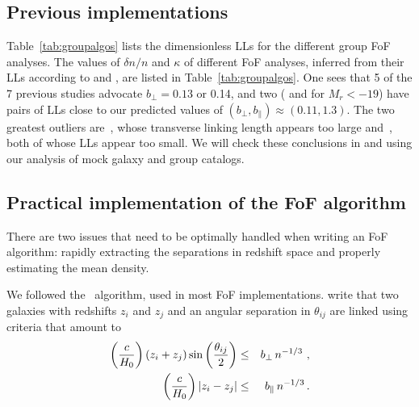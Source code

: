 \subsection{Previous implementations}

Table~\ref{tab:groupalgos} lists the dimensionless LLs for the different group
FoF analyses. The values of $\delta n/n$ and $\kappa$ of different FoF
analyses, inferred from their LLs according to 
and , are listed in Table~\ref{tab:groupalgos}.
One sees that 5 of the 7 previous studies advocate $b_\perp = 0.13$ or 0.14,
and two (\citealp{Eke+04} and \citealp{Tempel+14} for $M_r < -19$) have pairs
of LLs close to our predicted values of $(b_\perp,b_\parallel)\approx
(0.11,1.3)$. The two greatest outliers are~\cite{HG82}, whose transverse
linking length appears too large and~\cite{Robotham+11}, both of whose LLs
appear too small. We will check these conclusions in 
and  using our analysis of mock galaxy and group
catalogs.

\subsection{Practical implementation of the FoF algorithm}
\label{sec:algo}

There are two issues that need to be optimally handled when writing an FoF
algorithm: rapidly extracting the separations in redshift space and properly
estimating the mean density.

We followed the~\cite{HG82} algorithm, used in most FoF implementations.
\citeauthor{HG82} write that two galaxies with redshifts $z_i$ and $z_j$ and an
angular separation in $\theta_{ij}$ are linked using criteria that amount to
%
\begin{eqnarray}\label{eq:crit1}
    \left({c \over H_0}\right)\left(z_i + z_j\right)\sin\left({\theta_{ij}\over2}\right)
    & \leq & b_\bot \, n^{-1/3} \ , \\
\label{eq:crit2}
    \left({c \over H_0}\right)\left|z_i-z_j\right| &\leq & b_\parallel
    \, n^{-1/3}
\,.
\end{eqnarray}
%

